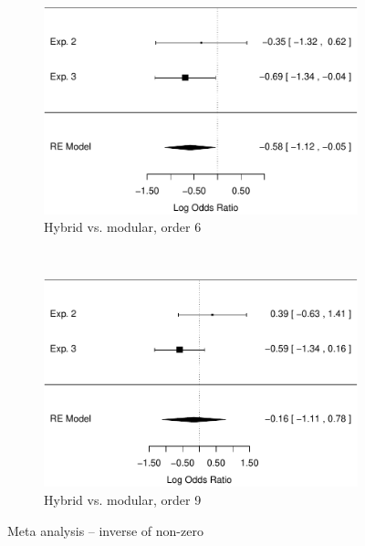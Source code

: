 \documentclass[man,mask,10pt]{apa6}
\begin{document}
\begin{figure}
\begin{subfigure}[c]{0.4\textwidth}
\end{subfigure} \\
\centering
\begin{subfigure}[c]{0.4\textwidth}
\centering
\includegraphics[width=\textwidth]{figures/meta/question_typeinverse_nonzero_6_conditionhybrid.pdf}
\caption{Hybrid vs. modular, order 6}
\end{subfigure}
~
\begin{subfigure}[c]{0.4\textwidth}
\centering
\includegraphics[width=\textwidth]{figures/meta/question_typeinverse_nonzero_9_conditionhybrid.pdf}
\caption{Hybrid vs. modular, order 9}
\end{subfigure}
\caption{Meta analysis -- inverse of non-zero}
\label{meta_inNZ}
\end{figure}\noindent 

\FloatBarrier
\end{document}
